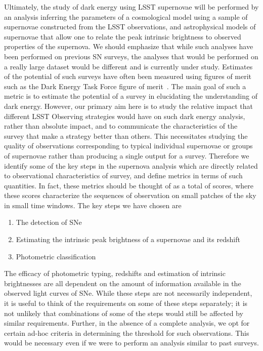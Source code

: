 Ultimately, the study of dark energy using LSST supernovae will be performed by an analysis inferring the parameters of a cosmological model using a sample of supernovae constructed from the LSST observations, and astrophysical models of supernovae that allow one to relate the peak intrinsic brightness to observed properties of the supernova. We should emphasize that while such analyses have been performed on previous SN surveys, the analyses that would be performed on a really large dataset would be different and is currently under study. Estimates of the potential of such surveys have often been measured using figures of merit such as the Dark Energy Task Force figure of merit~\citep{Albrecht2006}. The main goal of such a metric is to estimate the potential of a survey in elucidating the understanding of dark energy. However, our primary aim here is to study the relative impact that different LSST Observing strategies would have on such dark energy analysis, rather than absolute impact, and to communicate the characteristics of the survey that make a strategy better than others. This necessitates studying the quality of observations corresponding to typical individual supernovae or groups of supernovae rather than producing a single output for a survey. Therefore we identify some of the key steps in the supernova analysis which are directly related to observational characteristics of survey, and define metrics in terms of such quantities. In fact, these metrics should be  thought of as a total of scores, where these scores characterize the sequences of observation on small patches of the sky in small time windows. The key steps we have chosen are
\begin{enumerate}
\renewcommand{\theenumi}{\alph{enumi}}
\item The detection of SNe \label{it:detection}
\item Estimating the intrinsic peak brightness of a supernovae and its redshift
\item Photometric classification \label{it:typing}
\end{enumerate}
The efficacy of photometric typing, redshifts and estimation of intrinsic brightnesses
are all dependent on the amount of information available in the observed
light curves of SNe. While these steps are not necessarily independent, it
is useful to think of the requirements on some of these steps separately;
it is not unlikely  that combinations of some of the steps would still be
affected by similar requirements. Further, in the absence of a complete analysis, we opt for certain ad-hoc criteria in determining the threshold for such observations. This would be necessary even if we were to perform an analysis similar to past surveys.

